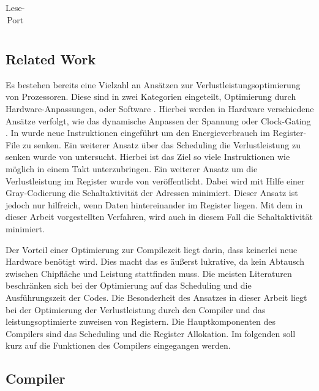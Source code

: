 \begin{table}[htbp]
\begin{minipage}{.5\textwidth}
\begin{tabular}{cccccccccccccccccc}
		\end{tabular}
		\caption{\label{lese-port}Lese-Port}
	\end{minipage}
\end{table}


\newpage
\subsection{Related Work}

Es bestehen bereits eine Vielzahl an Ansätzen zur Verlustleistungsoptimierung von Prozessoren. Diese sind in zwei Kategorien eingeteilt, Optimierung durch Hardware-Anpassungen\cite{wu2000clock, horowitz1994low, hajj1998architectural}, oder Software \cite{gebotys1997low, asanovic2000energy, toburen1998instruction, su1995cache }. Hierbei werden in Hardware verschiedene Ansätze verfolgt, wie das dynamische Anpassen der Spannung \cite{horowitz1994low} oder Clock-Gating \cite{wu2000clock}. In \cite{asanovic2000energy} wurde neue Instruktionen eingeführt um den Energieverbrauch im Register-File zu senken. Ein weiterer Ansatz über das Scheduling die Verlustleistung zu senken wurde von \cite{toburen1998instruction} untersucht. Hierbei ist das Ziel so viele Instruktionen wie möglich in einem Takt unterzubringen.
Ein weiterer Ansatz um die Verlustleistung im Register wurde von \cite{su1995cache} veröffentlicht. Dabei wird mit Hilfe einer Gray-Codierung die Schaltaktivität der Adressen minimiert. Dieser Ansatz ist jedoch nur hilfreich, wenn Daten hintereinander im Register liegen. Mit dem in dieser Arbeit vorgestellten Verfahren, wird auch in diesem Fall die Schaltaktivität minimiert.

Der Vorteil einer Optimierung zur Compilezeit liegt darin, dass keinerlei neue Hardware benötigt wird. Dies macht das es äußerst lukrative, da kein Abtausch zwischen Chipfläche und Leistung stattfinden muss. Die meisten Literaturen beschränken sich bei der Optimierung auf das Scheduling und die Ausführungszeit der Codes. Die Besonderheit des Ansatzes in dieser Arbeit liegt bei der Optimierung der Verlustleistung durch den Compiler und das leistungsoptimierte zuweisen von Registern. Die Hauptkomponenten des Compilers sind das Scheduling und die Register Allokation. Im folgenden soll kurz auf die Funktionen des Compilers eingegangen werden. 
\subsection{Compiler}

